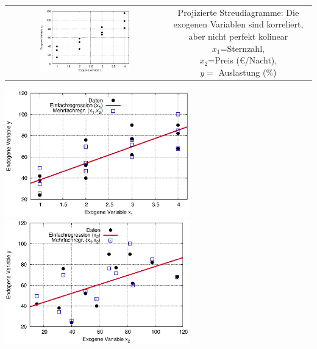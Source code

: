 \documentclass[a4paper]{foils}
\begin{document}
\begin{landscape}
\begin{center}


\vspace{0em}  

\begin{tabular}{cc}
\includegraphics[width=0.6\textwidth]{figsRegr/hotel_scatterplot_x1x2.eps}
&
\parbox{0.5\textwidth}{\vspace{-10em}

Projizierte Streudiagramme: Die 
exogenen Variablen sind korreliert, aber nicht perfekt kolinear\\
$x_1$=Sternzahl,\\ $x_2$=Preis (\euro{}/Nacht),\\ $y=$ Auslastung (\%)
}
\end{tabular}

\vspace{0em}

\includegraphics[width=0.6\textwidth]{figsRegr/hotel_scatterplot_x1y.eps}
\includegraphics[width=0.6\textwidth]{figsRegr/hotel_scatterplot_x2y.eps}




\end{center}
\end{landscape}
\end{document}
